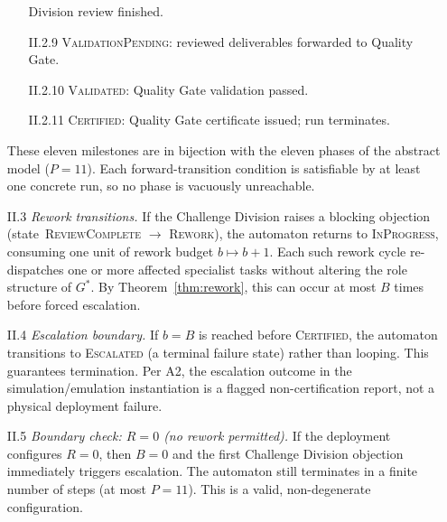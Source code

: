 \documentclass[12pt]{article}
\theoremstyle{definition}
\begin{document}
\begin{enumerate}
\begin{enumerate}
                                  Division review finished.
                    \item[II.2.9] \textsc{ValidationPending}:
                                  reviewed deliverables forwarded to
                                  Quality Gate.
                    \item[II.2.10] \textsc{Validated}: Quality Gate
                                   validation passed.
                    \item[II.2.11] \textsc{Certified}: Quality Gate
                                   certificate issued; run terminates.
                \end{enumerate}
                These eleven milestones are in bijection with the eleven
                phases of the abstract model ($P = 11$).
                Each forward-transition condition is satisfiable by at
                least one concrete run, so no phase is vacuously
                unreachable.  \checkmark

    \item[II.3] \emph{Rework transitions.}  If the Challenge Division
                raises a blocking objection (state~\textsc{ReviewComplete}
                $\to$ \textsc{Rework}), the automaton returns to
                \textsc{InProgress}, consuming one unit of rework budget
                $b \mapsto b + 1$.  Each such rework cycle re-dispatches
                one or more affected specialist tasks without altering
                the role structure of $G^{*}$.  By
                Theorem~\ref{thm:rework}, this can occur at most $B$
                times before forced escalation. \checkmark

    \item[II.4] \emph{Escalation boundary.}  If $b = B$ is reached
                before \textsc{Certified}, the automaton transitions to
                \textsc{Escalated} (a terminal failure state) rather
                than looping.  This guarantees termination.  Per A2,
                the escalation outcome in the simulation/emulation
                instantiation is a flagged non-certification report, not
                a physical deployment failure. \checkmark

    \item[II.5] \emph{Boundary check: $R = 0$ (no rework permitted).}
                If the deployment configures $R = 0$, then $B = 0$ and
                the first Challenge Division objection immediately
                triggers escalation.  The automaton still terminates in
                a finite number of steps (at most $P = 11$).  This is
                a valid, non-degenerate configuration. \checkmark


\end{enumerate}
\end{document}
